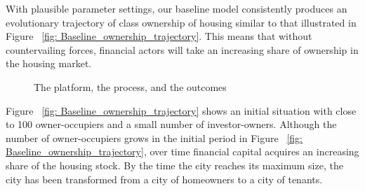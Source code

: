 With plausible parameter settings, our baseline model consistently produces an evolutionary trajectory of class ownership of housing similar to that illustrated in Figure ~\ref{fig: Baseline_ownership_trajectory}. 
This means that without countervailing forces, financial actors will take an increasing share of ownership in the housing market. 
\begin{figure}
\centering
{}
\caption{The platform, the process, and the outcomes}
\label{fig:outcomes}
\end{figure}

 Figure ~\ref{fig: Baseline_ownership_trajectory} shows an initial situation with close to 100 owner-occupiers and a small number of investor-owners. Although the number of owner-occupiers grows in the initial period in Figure ~\ref{fig: Baseline_ownership_trajectory}, over time financial capital acquires an increasing share of the housing stock. By the time the city reaches its maximum size, the city has been transformed from a city of homeowners to a city of tenants.



